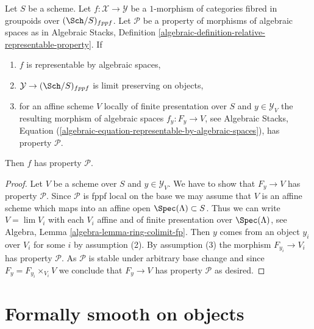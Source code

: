 \begin{lemma}
\label{lemma-check-property-limit-preserving}
Let $S$ be a scheme. Let $f : \mathcal{X} \to \mathcal{Y}$ be a $1$-morphism
of categories fibred in groupoids over $(\Sch/S)_{fppf}$. Let $\mathcal{P}$
be a property of morphisms of algebraic spaces as in
Algebraic Stacks, Definition
\ref{algebraic-definition-relative-representable-property}. If
\begin{enumerate}
\item $f$ is representable by algebraic spaces,
\item $\mathcal{Y} \to (\Sch/S)_{fppf}$ is limit preserving on objects,
\item for an affine scheme $V$ locally of finite presentation over $S$ and
$y \in \mathcal{Y}_V$ the resulting morphism of algebraic spaces
$f_y : F_y \to V$, see Algebraic Stacks, Equation
(\ref{algebraic-equation-representable-by-algebraic-spaces}),
has property $\mathcal{P}$.
\end{enumerate}
Then $f$ has property $\mathcal{P}$.
\end{lemma}

\begin{proof}
Let $V$ be a scheme over $S$ and $y \in \mathcal{Y}_V$. We have to show
that $F_y \to V$ has property $\mathcal{P}$. Since $\mathcal{P}$ is
fppf local on the base we may assume that $V$ is an affine scheme which
maps into an affine open $\Spec(\Lambda) \subset S$. Thus we can write
$V = \lim V_i$ with each $V_i$ affine and of finite presentation over
$\Spec(\Lambda)$, see Algebra, Lemma \ref{algebra-lemma-ring-colimit-fp}.
Then $y$ comes from an object $y_i$ over $V_i$ for some $i$ by assumption (2).
By assumption (3) the morphism $F_{y_i} \to V_i$ has property $\mathcal{P}$.
As $\mathcal{P}$ is stable under arbitrary base change and since
$F_y = F_{y_i} \times_{V_i} V$ we conclude that $F_y \to V$ has property
$\mathcal{P}$ as desired.
\end{proof}



\section{Formally smooth on objects}
\label{section-formally-smooth}

